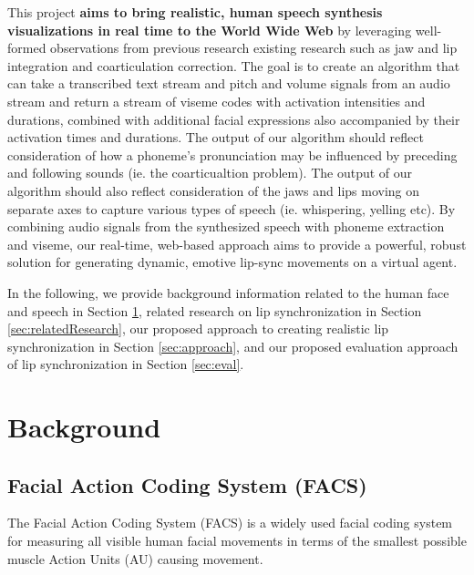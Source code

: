\documentclass[12pt]{article}
\begin{document}
 This project {\bf aims to bring realistic, human speech synthesis visualizations in real time to the World Wide Web} by leveraging well-formed observations from previous research existing research such as jaw and lip integration and coarticulation correction.
The goal is to create an algorithm that can take a transcribed text stream and pitch and volume signals from an audio stream and return a stream of viseme codes with activation intensities and durations, combined with additional facial expressions also accompanied by their activation times and durations.  The  output of our algorithm should reflect consideration of how a phoneme's pronunciation may be influenced by preceding and following sounds (ie. the coarticualtion problem). The output of our algorithm should also reflect consideration of the jaws and lips moving on separate axes to capture various types of speech (ie. whispering, yelling etc). 
By combining audio signals from the synthesized speech with phoneme extraction and viseme, our real-time, web-based approach aims to provide a powerful, robust solution for generating dynamic, emotive lip-sync movements on a virtual agent. 

In the following, we provide background information related to the human face and speech in Section \ref{sec:background}, related research on lip synchronization in Section \ref{sec:relatedResearch}, our proposed approach to creating realistic lip synchronization in Section \ref{sec:approach}, and our proposed evaluation approach of  lip synchronization in Section \ref{sec:eval}.
\newpage
\section{Background}
\label{sec:background}

\subsection{Facial Action Coding System (FACS)}
\label{sec:FACS}

The Facial Action Coding System (FACS) \cite{Ekman1976MeasuringMovement} is a widely
used facial coding system for measuring all visible human facial 
movements in terms of the smallest possible muscle Action
Units (AU) causing movement. 
\end{document}
